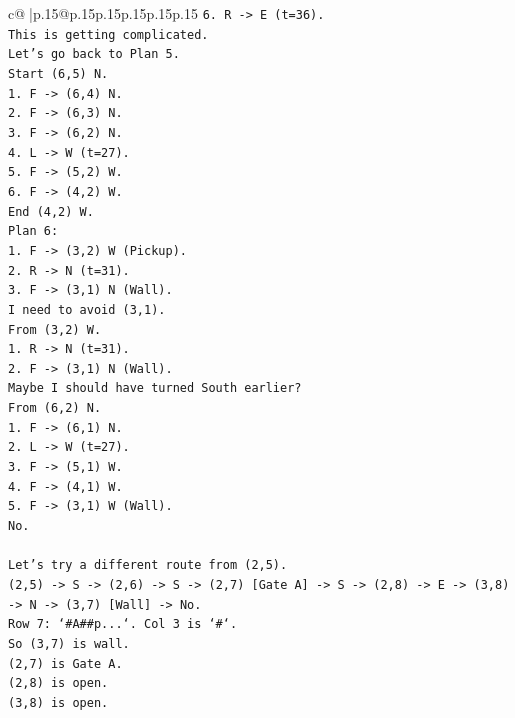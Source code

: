 \documentclass{article}
\begin{document}
{\begin{supertabular}{c@{$\;$}|p{.15\linewidth}@{}p{.15\linewidth}p{.15\linewidth}p{.15\linewidth}p{.15\linewidth}p{.15\linewidth}}
{{{\texttt{6. R {-}> E (t=36).} \\
\texttt{This is getting complicated.} \\
\texttt{Let's go back to Plan 5.} \\
\texttt{Start (6,5) N.} \\
\texttt{1. F {-}> (6,4) N.} \\
\texttt{2. F {-}> (6,3) N.} \\
\texttt{3. F {-}> (6,2) N.} \\
\texttt{4. L {-}> W (t=27).} \\
\texttt{5. F {-}> (5,2) W.} \\
\texttt{6. F {-}> (4,2) W.} \\
\texttt{End (4,2) W.} \\
\texttt{Plan 6:} \\
\texttt{1. F {-}> (3,2) W (Pickup).} \\
\texttt{2. R {-}> N (t=31).} \\
\texttt{3. F {-}> (3,1) N (Wall).} \\
\texttt{I need to avoid (3,1).} \\
\texttt{From (3,2) W.} \\
\texttt{1. R {-}> N (t=31).} \\
\texttt{2. F {-}> (3,1) N (Wall).} \\
\texttt{Maybe I should have turned South earlier?} \\
\texttt{From (6,2) N.} \\
\texttt{1. F {-}> (6,1) N.} \\
\texttt{2. L {-}> W (t=27).} \\
\texttt{3. F {-}> (5,1) W.} \\
\texttt{4. F {-}> (4,1) W.} \\
\texttt{5. F {-}> (3,1) W (Wall).} \\
\texttt{No.} \\
\\ 
\texttt{Let's try a different route from (2,5).} \\
\texttt{(2,5) {-}> S {-}> (2,6) {-}> S {-}> (2,7) {[}Gate A{]} {-}> S {-}> (2,8) {-}> E {-}> (3,8) {-}> N {-}> (3,7) {[}Wall{]} {-}> No.} \\
\texttt{Row 7: `\#A\#\#p...`. Col 3 is `\#`.} \\
\texttt{So (3,7) is wall.} \\
\texttt{(2,7) is Gate A.} \\
\texttt{(2,8) is open.} \\
\texttt{(3,8) is open.} \\
}}}
\end{supertabular}}
\end{document}
